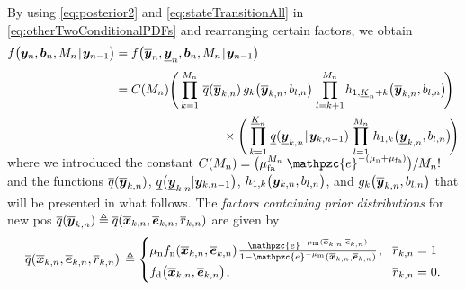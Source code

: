 \documentclass[11pt,a4paper]{article}
\newcommand{\ist}{\hspace*{.3mm}}
\newcommand{\rmv}{\hspace*{-.3mm}}
\newcommand{\nn}{\nonumber}
\begin{document}
By using \eqref{eq:posterior2} and \eqref{eq:stateTransitionAll} in \eqref{eq:otherTwoConditionalPDFs} and rearranging certain factors, we obtain
\begin{align}
f\big(\V{y}_n, \V{b}_n,  M_n \ist | \ist \V{y}_{n-1}\big) &=f\big(\overline{\V{y}}_n, \underline{\V{y}}_n, \V{b}_n,  M_n \ist | \ist \V{y}_{n-1}\big) \nn\\[1mm]
&=  C(M_n)  \Bigg( \prod^{M_n}_{k = 1} \ist \ist  \overline{q}(\overline{\V{y}}_{k,n}) \ist\ist g_k\big( \overline{\V{y}}_{k,n}, b_{l,n} \big) \ist \prod^{M_n}_{l=k+1} \rmv h_{1,\underline{K}_n+k}\big( \overline{\V{y}}_{k,n}, b_{l,n} \big) \rmv\rmv\Bigg) \nn\\
&\hspace{30.8mm}\times\Bigg(\prod^{\underline{K}_n}_{k = 1} \ist \underline{q}(\underline{\V{y}}_{k,n} \ist | \ist \V{y}_{k,n-1} ) \ist\ist \prod^{M_n}_{l=1} \ist\ist h_{1,k}\big( \underline{\V{y}}_{k,n}, b_{l,n} \big) \rmv\rmv \Bigg)  \label{eq:priorSingle}  \\[-8.5mm]
\nn
\end{align}
where we introduced the constant $C(M_n) = \big(\mu_{\mathrm{fa}}^{M_n}\ist\ist\ist \mathpzc{e}^{-( \mu_{\mathrm{n}} + \mu_{\mathrm{fa}} )}\big)/M_n!$ and the functions $\overline{q}(\overline{\bm{y}}_{k,n})$, $\underline{q}\big(\underline{\bm{y}}_{k,n} | \bm{y}_{k,n-1} \big)$, $h_{1,k}\big( \bm{y}_{k,n}, b_{l,n} \big)$, and $g_k\big( \overline{\bm{y}}_{k,n}, b_{l,n} \big)$ that will be presented in what follows. The \textit{factors containing prior distributions} for new \acp{po} $\overline{q}(\overline{\bm{y}}_{k,n}) \triangleq \overline{q}(\overline{\bm{x}}_{k,n},\overline{\bm{e}}_{k,n},\overline{r}_{k,n})$ are given \vspace{0mm} by
\begin{align}
\overline{q}(\overline{\V{x}}_{k,n},\overline{\V{e}}_{k,n},\overline{r}_{k,n})  &\,\triangleq \begin{cases}
      \mu_{\mathrm{n}} f_{\mathrm{n}}(\overline{\V{x}}_{k,n}, \overline{\V{e}}_{k,n}) \ist \frac{\mathpzc{e}^{-\mu_{\mathrm{m}}(\overline{\V{x}}_{k,n},\overline{\V{e}}_{k,n}) }}{1 - \mathpzc{e}^{-\mu_{\mathrm{m}}}(\overline{\V{x}}_{k,n},\overline{\V{e}}_{k,n})}  \ist, 
       & \rmv\rmv \overline{r}_{k,n} = 1 \\[1mm]
     f_{\mathrm{d}}\big(\overline{\V{x}}_{k,n}, \overline{\V{e}}_{k,n}\big) \ist,  & \rmv\rmv \overline{r}_{k,n} = 0.
  \end{cases} \nn\\[-11.5mm]
    \nn\\
  \nn
\end{align}
\end{document}
